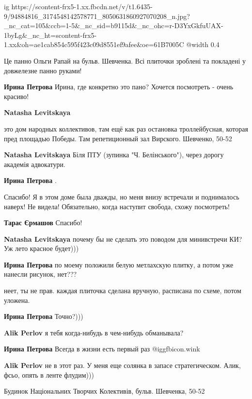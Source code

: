 
 
 
 
 

\ifcmt
  ig https://scontent-frx5-1.xx.fbcdn.net/v/t1.6435-9/94884816_3174548142578771_8050631860927070208_n.jpg?_nc_cat=105&ccb=1-5&_nc_sid=b9115d&_nc_ohc=r-D3YxGkfuUAX-1byLg&_nc_ht=scontent-frx5-1.xx&oh=ae1cab854c595f423c09d8551ef9afee&oe=61B7005C
  @width 0.4
\fi


Це панно Ольги Рапай на бульв. Шевченка. Всі плиточки зроблені та покладені у
довжелезне панно руками!

\textbf{Ирина Петрова} Ирина, где конкретно это пано? Хочется посмотреть - очень красиво!

\textbf{Natasha Levitskaya} 

это дом народных коллективов, там ещё как раз остановка троллейбусная, которая
пред площадью Победы. Там репетиционный зал Вирского. Шевченко, 50-52

\textbf{Natasha Levitskaya} Біля ПТУ (зупинка "Ч. Белінського"), через дорогу академія адвокатури.

\textbf{Ирина Петрова} .

Спасибо! Я в этом доме была дважды, но меня внизу встречали и поднималось
наверх! Не видела! Обязательно, когда наступит свобода, схожу посмотреть!

\textbf{Тарас Єрмашов} Спасибо!

\textbf{Natasha Levitskaya} почему бы не сделать это поводом для минивстречи КИ? Уж лето красное будет)))

\textbf{Ирина Петрова} по моему положили белую метлахскую плитку, а потом уже нанесли рисунок, нет???

неет, ты не прав. каждая плиточка сделана вручную, расписана по схеме, потом уложена.

\textbf{Ирина Петрова} Точно?)))

\textbf{Alik Perlov} я тебя когда-нибудь в чем-нибудь обманывала?

\textbf{Ирина Петрова} Всегда в жизни есть первый раз @igg{fbicon.wink} 

\textbf{Alik Perlov} не в этот раз. У меня еще солянка в запасе стратегическом. Алик, фсьо, опять в ленте флудим)))

Будинок Національних Творчих Колективів, бульв. Шевченка, 50-52
